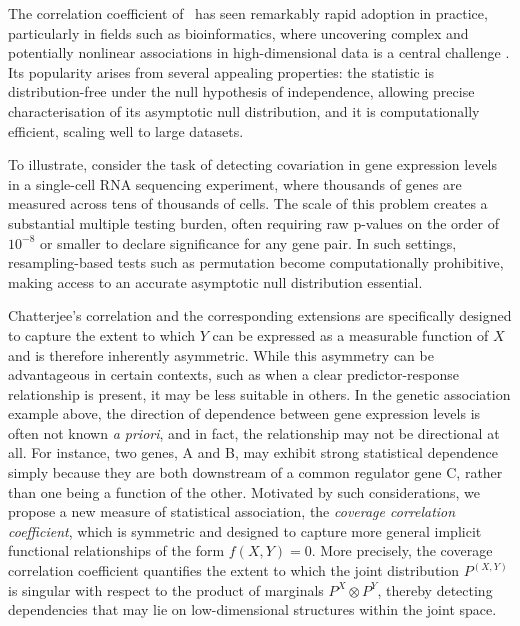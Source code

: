 \documentclass[11pt]{article}
\begin{document}

The correlation coefficient of~\citet{chatterjee2021new} has seen remarkably rapid adoption in practice, particularly in fields such as bioinformatics, where uncovering complex and potentially nonlinear associations in high-dimensional data is a central challenge \citep[e.g.][]{dong2023causal,suo2024dandelion,sansalone2024unexpectedly}. Its popularity arises from several appealing properties: the statistic is distribution-free under the null hypothesis of independence, allowing precise characterisation of its asymptotic null distribution, and it is computationally efficient, scaling well to large datasets. 

To illustrate, consider the task of detecting covariation in gene expression levels in a single-cell RNA sequencing experiment, where thousands of genes are measured across tens of thousands of cells. The scale of this problem creates a substantial multiple testing burden, often requiring raw p-values on the order of $10^{-8}$ or smaller to declare significance for any gene pair. In such settings, resampling-based tests such as permutation become computationally prohibitive, making access to an accurate asymptotic null distribution essential.

Chatterjee's correlation and the corresponding extensions are specifically designed to capture the extent to which $Y$ can be expressed as a measurable function of $X$ and is therefore inherently asymmetric. While this asymmetry can be advantageous in certain contexts, such as when a clear predictor-response relationship is present, it may be less suitable in others. In the genetic association example above, the direction of dependence between gene expression levels is often not known \emph{a priori}, and in fact, the relationship may not be directional at all. For instance, two genes, A and B, may exhibit strong statistical dependence simply because they are both downstream of a common regulator gene C, rather than one being a function of the other. Motivated by such considerations, we propose a new measure of statistical association, the \emph{coverage correlation coefficient}, which is symmetric and designed to capture more general implicit functional relationships of the form $f(X, Y) = 0$. More precisely, the coverage correlation coefficient quantifies the extent to which the joint distribution $P^{(X,Y)}$ is singular with respect to the product of marginals  $P^X \otimes P^Y$, thereby detecting dependencies that may lie on low-dimensional structures within the joint space.
\end{document}
